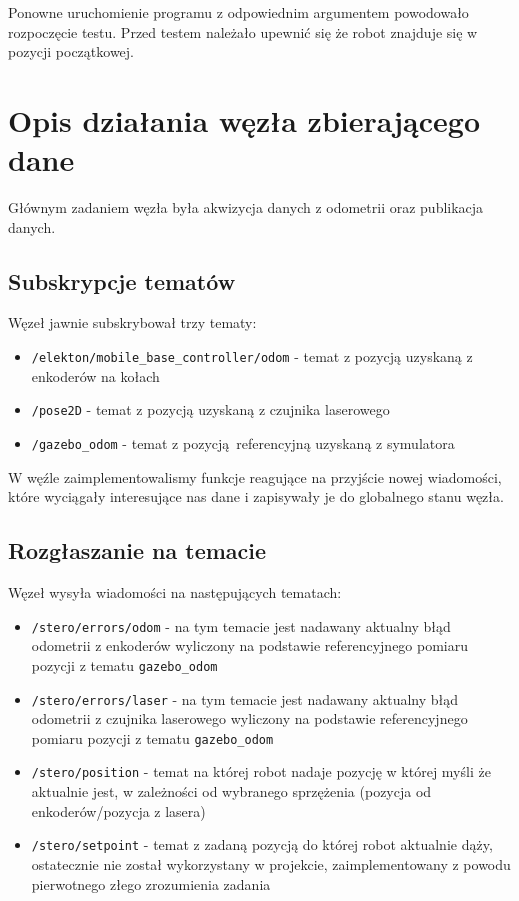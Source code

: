 \documentclass{mwrep}
\begin{document}
Ponowne uruchomienie programu z odpowiednim argumentem powodowało rozpoczęcie 
testu. Przed testem należało upewnić się że robot znajduje się w pozycji początkowej.

\section{Opis działania węzła zbierającego dane}
\label{pro1_datadescription}
Głównym zadaniem węzła była akwizycja danych z odometrii oraz publikacja danych.

\subsection{Subskrypcje tematów}
\label{pro1_datadescription_subscribers}

Węzeł jawnie subskrybował trzy tematy:

\begin{itemize}
	\item \texttt{/elekton/mobile\_{}base\_{}controller/odom} - temat z pozycją uzyskaną z enkoderów na kołach
	\item \texttt{/pose2D} - temat z pozycją uzyskaną z czujnika laserowego
	\item \texttt{/gazebo\_{}odom} - temat z pozycją referencyjną uzyskaną z symulatora\\
\end{itemize}

W węźle zaimplementowalismy funkcje reagujące na przyjście nowej wiadomości, które wyciągały 
interesujące nas dane i zapisywały je do globalnego stanu węzła. 

\subsection{Rozgłaszanie na temacie}
\label{pro1_datadescription_broadcasters}
Węzeł wysyła wiadomości na następujących tematach:
\begin{itemize}
	\item \texttt{/stero/errors/odom} - na tym temacie jest nadawany aktualny błąd odometrii z enkoderów
	wyliczony na podstawie referencyjnego pomiaru pozycji z tematu \texttt{gazebo\_{}odom}
	\item \texttt{/stero/errors/laser} - na tym temacie jest nadawany aktualny błąd odometrii z czujnika 
	laserowego wyliczony na podstawie referencyjnego pomiaru pozycji z tematu \texttt{gazebo\_{}odom}
	\item \texttt{/stero/position} - temat na której robot nadaje pozycję w której myśli że aktualnie jest,
	w zależności od wybranego sprzężenia (pozycja od enkoderów/pozycja z lasera)
	\item \texttt{/stero/setpoint} - temat z zadaną pozycją do której robot aktualnie dąży, ostatecznie 
	nie został wykorzystany w projekcie, zaimplementowany z powodu pierwotnego złego zrozumienia zadania\\
\end{itemize}
\end{document}
